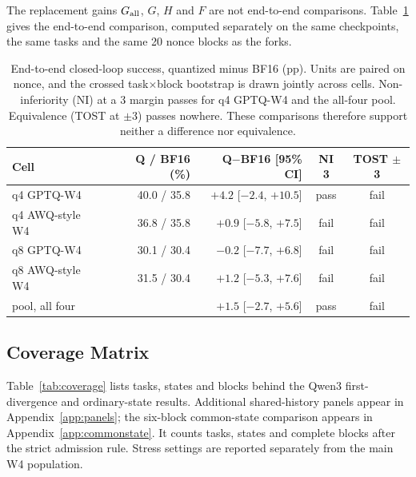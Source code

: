 The replacement gains $G_{\mathrm{all}}$, $G$, $H$ and $F$ are not end-to-end comparisons. Table~\ref{tab:e2e} gives the end-to-end comparison, computed separately on the same checkpoints, the same tasks and the same 20 nonce blocks as the forks. %

\begin{table}[t]
\centering%
\renewcommand{\arraystretch}{1.12}\fontsize{8.5}{10}\selectfont\setlength{\tabcolsep}{4pt}
\setlength{\tabcolsep}{4pt}
\begin{tabular}{@{}lrrcc@{}}
\toprule
Cell & Q / BF16 (\%) & Q$-$BF16 [95\% CI] & NI 3\pp{} & TOST $\pm$3\pp{} \\
\midrule
q4 GPTQ-W4 & 40.0 / 35.8 & $+4.2$ [$-2.4$, $+10.5$] & pass & fail \\
q4 AWQ-style W4  & 36.8 / 35.8 & $+0.9$ [$-5.8$, $+7.5$] & fail & fail \\
q8 GPTQ-W4 & 30.1 / 30.4 & $-0.2$ [$-7.7$, $+6.8$] & fail & fail \\
q8 AWQ-style W4  & 31.5 / 30.4 & $+1.2$ [$-5.3$, $+7.6$] & fail & fail \\
pool, all four & & $+1.5$ [$-2.7$, $+5.6$] & pass & fail \\
\bottomrule
\end{tabular}
\caption{End-to-end closed-loop success, quantized minus BF16 (pp). Units are paired on nonce, and the crossed task$\times$block bootstrap is drawn jointly across cells. Non-inferiority (NI) at a 3\pp{} margin passes for q4 GPTQ-W4 and the all-four pool. Equivalence (TOST at $\pm$3\pp{}) passes nowhere. These comparisons therefore support neither a difference nor equivalence.}
\label{tab:e2e}
\end{table}


\subsection{Coverage Matrix}
\label{app:coverage}

Table~\ref{tab:coverage} lists tasks, states and blocks behind the Qwen3 first-divergence and ordinary-state results. Additional shared-history panels appear in Appendix~\ref{app:panels}; the six-block common-state comparison appears in Appendix~\ref{app:commonstate}. It counts tasks, states and complete blocks after the strict admission rule. Stress settings are reported separately from the main W4 population. %

